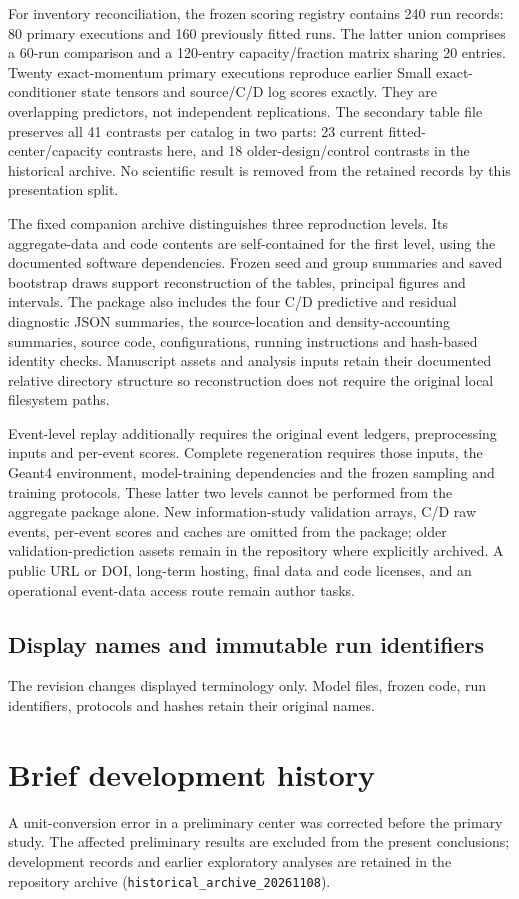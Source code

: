 \documentclass[11pt]{article}
\begin{document}
For inventory reconciliation, the frozen scoring registry contains 240 run
records: 80 primary executions and 160 previously fitted runs. The latter
union comprises a 60-run comparison and a 120-entry capacity/fraction matrix
sharing 20 entries. Twenty exact-momentum primary executions reproduce
earlier Small exact-conditioner state tensors and source/C/D log scores
exactly. They are overlapping predictors, not independent replications.
The secondary table file preserves all 41 contrasts per catalog in two parts:
23 current fitted-center/capacity contrasts here, and 18 older-design/control
contrasts in the historical archive. No scientific result is removed from
the retained records by this presentation split.

The fixed companion archive
distinguishes three reproduction levels. Its aggregate-data and code contents
are self-contained for the first level, using the documented software
dependencies. Frozen seed and group summaries and saved bootstrap draws
support reconstruction of the tables, principal figures and intervals.
The package also includes the four C/D predictive and residual diagnostic
JSON summaries, the source-location and density-accounting summaries,
source code, configurations, running instructions and hash-based identity
checks. Manuscript assets and analysis inputs retain their documented
relative directory structure so reconstruction does not require the original
local filesystem paths.

Event-level replay additionally requires the original event ledgers,
preprocessing inputs and per-event scores. Complete regeneration requires
those inputs, the Geant4 environment, model-training dependencies and the
frozen sampling and training protocols. These latter two levels cannot be
performed from the aggregate package alone. New information-study validation
arrays, C/D raw events, per-event scores and caches are omitted from the
package; older validation-prediction assets remain in the repository where
explicitly archived. A public URL or DOI, long-term hosting, final data and
code licenses, and an operational event-data access route remain author tasks.

\subsection{Display names and immutable run identifiers}
\label{sec:display_mapping}
The revision changes displayed terminology only. Model files, frozen code,
run identifiers, protocols and hashes retain their original names.


\section{Brief development history}
A unit-conversion error in a preliminary center was corrected before the
primary study. The affected preliminary results are excluded from the present
conclusions; development records and earlier exploratory analyses are retained
in the repository archive (\texttt{historical\_archive\_20261108}).
\end{document}
